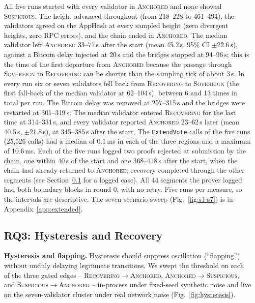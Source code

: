 All five runs started with every validator in \textsc{Anchored} and none showed \textsc{Suspicious}. The height advanced throughout (from 218--228 to 461--494), the
validators agreed on the AppHash at every sampled height (zero divergent heights, zero RPC errors), and the chain ended in \textsc{Anchored}.
The median validator left \textsc{Anchored} 33--77\,s after the start (mean 45.2\,s, 95\% CI $\pm$22.6\,s), against a Bitcoin delay injected at 20\,s and the bridges stopped at 94--96\,s; this is the time of the first departure from \textsc{Anchored}
because the passage through \textsc{Sovereign} to \textsc{Recovering} can be shorter than the sampling tick of about 3\,s. In every run six or seven validators fell back from \textsc{Recovering} to \textsc{Sovereign} (the first fall-back of the median validator at 62--104\,s),
between 6 and 13 times in total per run. The Bitcoin delay was removed at 297--315\,s and the bridges were restarted at 301--319\,s. The median validator entered \textsc{Recovering} for the last time at 314--331\,s, and every validator reported \textsc{Anchored} 23--62\,s later (mean 40.5\,s, $\pm$21.8\,s), at 345--385\,s after the start.
The \texttt{ExtendVote} calls of the five runs (25{,}526 calls) had a median of 0.1\,ms in each of the three regions and a maximum of 10.6\,ms.
Each of the five runs logged two proofs rejected at submission by the chain, one within 40\,s of the start and one 368--418\,s after the start, when the chain had already returned to \textsc{Anchored}; recovery completed through the other segments (see Section~\ref{subsec:rq3} for a logged case). All 44 segments the prover logged had both boundary blocks in round 0, with no retry.
Five runs per measure, so the intervals are descriptive.
The seven-scenario sweep (Fig.~\ref{fig:s1-s7}) is in Appendix~\ref{app:extended}.

\subsection{RQ3: Hysteresis and Recovery}
\label{subsec:rq3}

\textbf{Hysteresis and flapping.} Hysteresis should suppress oscillation (``flapping'') without unduly
delaying legitimate transitions. We swept the threshold on each of the
three gated edges -- \textsc{Recovering}$\to$\textsc{Anchored},
\textsc{Anchored}$\to$\textsc{Suspicious}, and
\textsc{Suspicious}$\to$\textsc{Anchored} -- in-process under fixed-seed
synthetic noise and live on the seven-validator cluster under real network
noise (Fig.~\ref{fig:hysteresis}).

